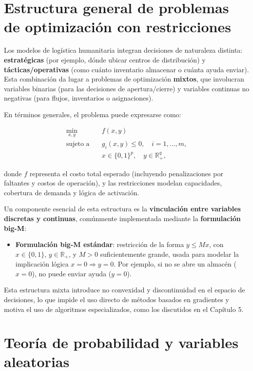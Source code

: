 \documentclass[
  spanish,
  us-letterpaper,
]{scrreprt}
\providecommand{\tightlist}{%
  \setlength{\itemsep}{0pt}\setlength{\parskip}{0pt}}
\numberwithin{equation}{section}
\begin{document}
\section{Estructura general de problemas de optimización con
restricciones}\label{sec-bigM}

Los modelos de logística humanitaria integran decisiones de naturaleza
distinta: \textbf{estratégicas} (por ejemplo, dónde ubicar centros de
distribución) y \textbf{tácticas/operativas} (como cuánto inventario
almacenar o cuánta ayuda enviar). Esta combinación da lugar a problemas
de optimización \textbf{mixtos}, que involucran variables binarias (para
las decisiones de apertura/cierre) y variables continuas no negativas
(para flujos, inventarios o asignaciones).

En términos generales, el problema puede expresarse como:

\[
\begin{aligned}
\min_{x,y} \quad & f(x, y) \\
\text{sujeto a} \quad & g_i(x, y) \leq 0, \quad i = 1,\dots,m, \\
& x \in \{0,1\}^p, \quad y \in \mathbb{R}_+^q,
\end{aligned}
\]

donde \(f\) representa el costo total esperado (incluyendo
penalizaciones por faltantes y costos de operación), y las restricciones
modelan capacidades, cobertura de demanda y lógica de activación.

Un componente esencial de esta estructura es la \textbf{vinculación
entre variables discretas y continuas}, comúnmente implementada mediante
la \textbf{formulación big-M}:

\begin{itemize}
\tightlist
\item
  \textbf{Formulación big-M estándar}: restricción de la forma
  \(y \leq M x\), con \(x \in \{0,1\}\), \(y \in \mathbb{R}_+\), y
  \(M > 0\) suficientemente grande, usada para modelar la implicación
  lógica \(x = 0 \Rightarrow y = 0\). Por ejemplo, si no se abre un
  almacén (\(x = 0\)), no puede enviar ayuda (\(y = 0\)).
\end{itemize}

Esta estructura mixta introduce no convexidad y discontinuidad en el
espacio de decisiones, lo que impide el uso directo de métodos basados
en gradientes y motiva el uso de algoritmos especializados, como los
discutidos en el Capítulo 5.

\section{Teoría de probabilidad y variables
aleatorias}\label{sec-variables}
\end{document}
